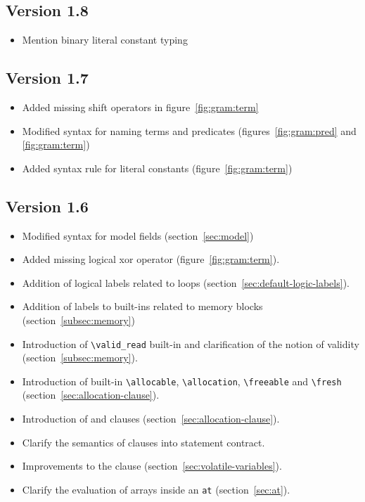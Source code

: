\documentclass[web]{frama-c-book}
\begin{document}
\subsection{Version 1.8}
\begin{itemize}
\item Mention binary literal constant typing
\end{itemize}

\subsection{Version 1.7}
\begin{itemize}
\item Added missing shift operators in figure~\ref{fig:gram:term}
\item Modified syntax for naming terms and predicates (figures~\ref{fig:gram:pred} and \ref{fig:gram:term})
\item Added syntax rule for literal constants (figure~\ref{fig:gram:term})
\end{itemize}

\subsection{Version 1.6}
\begin{itemize}
\item Modified syntax for model fields (section~\ref{sec:model})
\item Added missing logical xor operator (figure~\ref{fig:gram:term}).
\item Addition of logical labels related to loops
  (section~\ref{sec:default-logic-labels}).
\item Addition of labels to built-ins related to memory blocks
  (section~\ref{subsec:memory})
\item Introduction of \lstinline|\valid_read| built-in and clarification of
the notion of validity (section~\ref{subsec:memory}).
\item Introduction of built-in \lstinline|\allocable|,
  \lstinline|\allocation|, \lstinline|\freeable| and
  \lstinline|\fresh| (section~\ref{sec:allocation-clause}).
\item Introduction of \allocates and \frees clauses
  (section~\ref{sec:allocation-clause}).
\item Clarify the semantics of \assigns clauses into statement contract.
\item Improvements to the \volatile clause 
(section~\ref{sec:volatile-variables}).
\item Clarify the evaluation of arrays inside an \lstinline|at| 
  (section~\ref{sec:at}).
\end{itemize}
\end{document}
